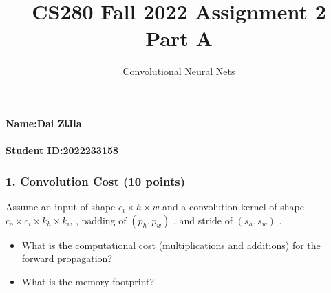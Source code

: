 \documentclass[12pt]{article}%
\begin{document}
\title{CS280 Fall 2022 Assignment 2 \\ Part A}
\author{Convolutional Neural Nets}
\maketitle

\paragraph{Name:Dai ZiJia}

\paragraph{Student ID:2022233158}

\newpage


\subsubsection*{1. Convolution Cost (10 points)}
Assume an input of shape  $c_i\times h\times w$  and a convolution kernel of shape  $c_o\times c_i\times k_h\times k_w$ , padding of  $(p_h,p_w)$ , and stride of  $(s_h,s_w)$ .
\begin{itemize}
	\item What is the computational cost (multiplications and additions) for the forward propagation?
	\item What is the memory footprint?
\end{itemize}
\end{document}
